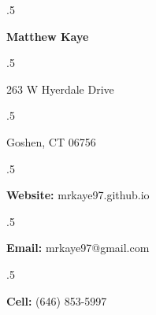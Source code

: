 \documentclass[margin, 10.85pt]{res} %
\begin{document}

\moveleft.5\hoffset\centerline{\large\bf Matthew Kaye} %
  
\moveleft.5\hoffset\centerline{263 W Hyerdale Drive}
\moveleft.5\hoffset\centerline{Goshen, CT 06756}
\medskip
\moveleft.5\hoffset\centerline{\textbf{Website:} mrkaye97.github.io}
\moveleft.5\hoffset\centerline{\textbf{Email:} mrkaye97@gmail.com} %
\moveleft.5\hoffset\centerline{\textbf{Cell:} (646) 853-5997}


\end{document}
